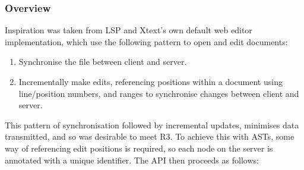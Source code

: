 \documentclass{article}
\begin{document}
\subsubsection{Overview}
Inspiration was taken from LSP and Xtext's own default web editor implementation, which use the following pattern to open and edit documents:
\begin{enumerate}
\item Synchronise the file between client and server.
\item Incrementally make edits, referencing positions within a document using line/position numbers, and ranges to synchronise changes between client and server. 
\end{enumerate}
%
This pattern of synchronisation followed by incremental updates, minimises data transmitted, and so was desirable to meet R3. To achieve this with ASTs, some way of referencing edit positions is required, so each node on the server is annotated with a unique identifier. The API then proceeds as follows:
\end{document}
